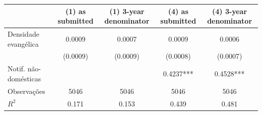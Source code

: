 \begin{tabular}{lcccc}
\toprule
& (1) as submitted & (1) 3-year denominator & (4) as submitted & (4) 3-year denominator \\
\midrule
Densidade evangélica & 0.0009 & 0.0007 & 0.0009 & 0.0006 \\
 & (0.0009) & (0.0009) & (0.0008) & (0.0007) \\
Notif. não-domésticas &  &  & 0.4237*** & 0.4528*** \\
\midrule
Observações & 5046 & 5046 & 5046 & 5046 \\
$R^2$ & 0.171 & 0.153 & 0.439 & 0.481 \\
\bottomrule
\end{tabular}
